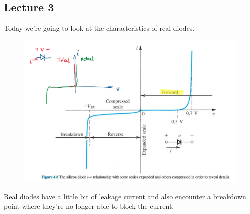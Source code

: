 \documentclass[10pt]{article}
\begin{document}
\subsection{Lecture 3}


Today we're going to look at the characteristics of real diodes.



\begin{figure}[H]
	\centering
	\includegraphics[width=0.8\linewidth]{img/image_2022-09-13-13-26-58.png}
\end{figure}

Real diodes have a little bit of leakage current and also encounter a breakdown point where they're no longer able to block the current.
\end{document}
